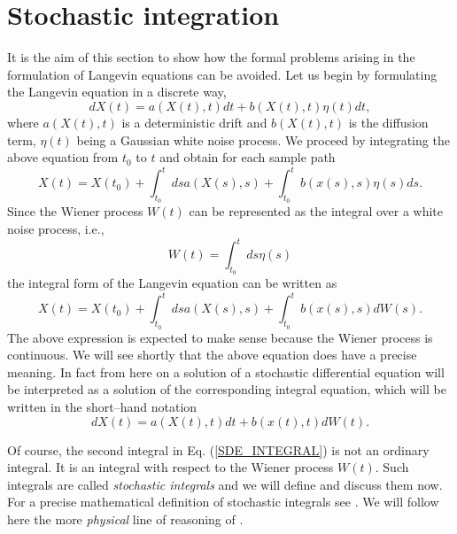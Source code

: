 \section{Stochastic integration}
It is the aim of this section to show how the formal problems
arising in the formulation of Langevin equations can be avoided.
Let us begin by formulating the Langevin equation in a discrete 
way,
\begin{equation*}
dX(t) = a(X(t),t) dt + b(X(t),t) \eta(t) dt,
\end{equation*}
where $a(X(t),t)$ is a deterministic drift and $b(X(t),t)$ is the 
diffusion term, $\eta(t)$ being a Gaussian white noise process.
We proceed by integrating the above equation from $t_0$ to $t$
and obtain for each sample path
\begin{equation*}
X(t) = X(t_0) + \int_{t_0}^t ds a(X(s),s) 
+ \int_{t_0}^t b(x(s),s) \eta(s) ds.
\end{equation*}
Since the Wiener process $W(t)$ can be represented as the integral
over a white noise process, i.e.,
\begin{equation}
W(t) = \int_{t_0}^t ds \eta(s)
\end{equation}
the integral form of the Langevin equation can be written as
\begin{equation}
\label{SDE_INTEGRAL}
X(t) = X(t_0) + \int_{t_0}^t ds a(X(s),s) 
+ \int_{t_0}^t b(x(s),s) dW(s).
\end{equation}
The above expression is 
expected to make sense because the Wiener process is continuous. 
We will see shortly that the above 
equation does have a precise meaning. In fact
from here on a solution of a stochastic differential equation will be 
interpreted as a solution 
of the corresponding integral equation, which will be written
in the short--hand notation
\begin{equation*}
dX(t) =   a(X(t),t) dt + b(x(t),t) dW(t).
\end{equation*}

Of course, the second integral in Eq. (\ref{SDE_INTEGRAL}) is not 
an ordinary integral.  It is an integral with respect to the 
Wiener process $W(t)$. Such integrals are called {\em stochastic 
integrals} and we will define and discuss them now. For a precise
mathematical definition of stochastic integrals see \cite{GARD, 
POTTER,KLOEDEN_AN,OETTINGER}. We will follow here the more
{\em physical} line of reasoning of \cite{GARDINER}.

